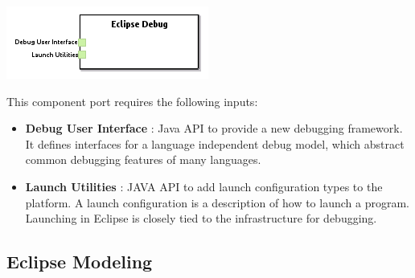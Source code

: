 \documentclass{gemoc} %
\begin{document}
\begin{center}
\includegraphics*[trim=0.0cm 0.0cm 0cm 0.0cm, clip=true]{../images/generated/Generated_Eclipse_Debug.png}
\end{center}

This component port requires the following inputs:
\begin{itemize}
  \item \textbf{Debug User Interface} :
Java API to provide a new debugging framework. It defines interfaces for a language independent debug model, which abstract common debugging features of many languages. 
  \item \textbf{Launch Utilities} :
JAVA API to add launch configuration types to the platform. A launch configuration is a description of how to launch a program. Launching in Eclipse is closely tied to the infrastructure for debugging.
\end{itemize}



\subsection{Eclipse Modeling}

\end{document}

